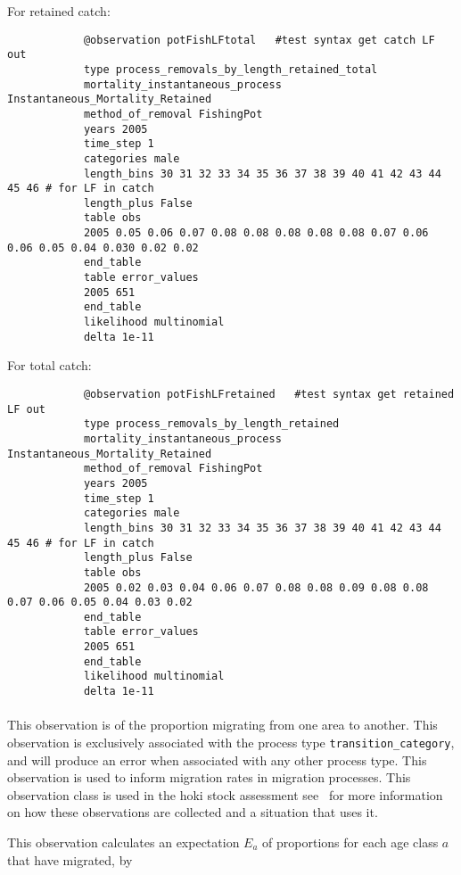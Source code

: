 \begin{itemize}
	For retained catch:
	
	{\small{\begin{verbatim}
			@observation potFishLFtotal   #test syntax get catch LF out
			type process_removals_by_length_retained_total
			mortality_instantaneous_process Instantaneous_Mortality_Retained
			method_of_removal FishingPot
			years 2005
			time_step 1
			categories male
			length_bins 30 31 32 33 34 35 36 37 38 39 40 41 42 43 44 45 46 # for LF in catch
			length_plus False
			table obs
			2005 0.05 0.06 0.07 0.08 0.08 0.08 0.08 0.08 0.07 0.06 0.06 0.05 0.04 0.030 0.02 0.02
			end_table
			table error_values
			2005 651
			end_table
			likelihood multinomial
			delta 1e-11
			\end{verbatim}}}
	
	For total catch:
	
	{\small{\begin{verbatim}
			@observation potFishLFretained   #test syntax get retained LF out
			type process_removals_by_length_retained
			mortality_instantaneous_process Instantaneous_Mortality_Retained
			method_of_removal FishingPot
			years 2005
			time_step 1
			categories male
			length_bins 30 31 32 33 34 35 36 37 38 39 40 41 42 43 44 45 46 # for LF in catch
			length_plus False
			table obs
			2005 0.02 0.03 0.04 0.06 0.07 0.08 0.08 0.09 0.08 0.08 0.07 0.06 0.05 0.04 0.03 0.02
			end_table
			table error_values
			2005 651
			end_table
			likelihood multinomial
			delta 1e-11
			\end{verbatim}}}
	
	
	\paragraph*{\label{sec:Proportions-migrating}}\label{sec:Observation-ProportionsMigrating}
	
	This observation is of the proportion migrating from one area to another. This observation is exclusively associated with the process type \texttt{transition\_category}, and will produce an error when associated with any other process type. This observation is used to inform migration rates in migration processes. This observation class is used in the hoki stock assessment see~\cite{francis_03} for more information on how these observations are collected and a situation that uses it.
	
	This observation calculates an expectation $E_a$ of proportions for each age class $a$ that have migrated, by
	

\end{itemize}
